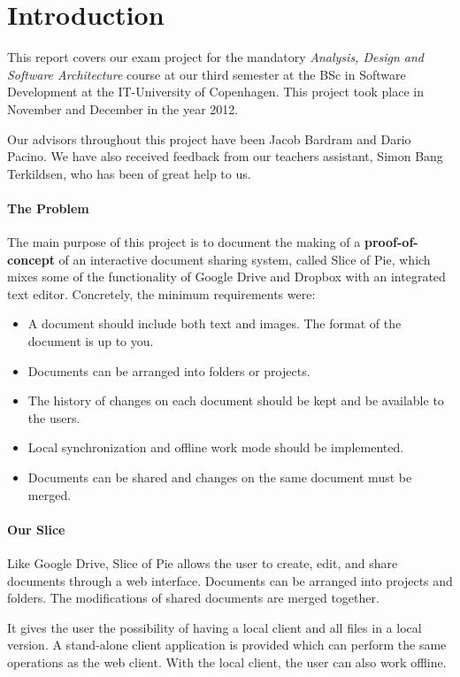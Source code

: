 \section{Introduction}
This report covers our exam project for the mandatory \emph{Analysis, Design and Software Architecture}
course at our third semester at the BSc in Software Development at the IT-University of Copenhagen.
This project took place in November and December in the year 2012. 

Our advisors throughout this project have been Jacob Bardram and Dario Pacino. We have also received feedback from
our teachers assistant, Simon Bang Terkildsen, who has been of great help to us.

\paragraph{The Problem}
The main purpose of this project is to document the making of a \textbf{proof-of-concept} of an interactive document
sharing system, called Slice of Pie, which mixes some of the functionality of Google Drive and Dropbox with
an integrated text editor.
Concretely, the minimum requirements were:
\begin{itemize}
\item A document should include both text and images. The format of the document is up to you.
\item Documents can be arranged into folders or projects.
\item The history of changes on each document should be kept and be available to the users.
\item Local synchronization and offline work mode should be implemented.
\item Documents can be shared and changes on the same document must be merged.
\end{itemize}
\paragraph{Our Slice}
Like Google Drive, Slice of Pie allows the user to create, edit, and share documents through a web interface.
Documents can be arranged into projects and folders. The modifications of shared documents are merged together.

It gives the user the possibility of having a local client and all files in a local version. A stand-alone client
application is provided which can perform the same operations as the web client. With the local client, the user
can also work offline.

